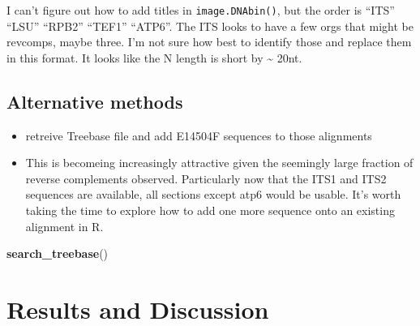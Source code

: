 \documentclass[11pt,]{article}
\newenvironment{Shaded}{\begin{snugshade}}{\end{snugshade}}
\newcommand{\KeywordTok}[1]{\textcolor[rgb]{0.13,0.29,0.53}{\textbf{{#1}}}}
\newcommand{\NormalTok}[1]{{#1}}
\providecommand{\tightlist}{%
  \setlength{\itemsep}{0pt}\setlength{\parskip}{0pt}}
\begin{document}
I can't figure out how to add titles in \texttt{image.DNAbin()}, but the
order is ``ITS'' ``LSU'' ``RPB2'' ``TEF1'' ``ATP6''. The ITS looks to
have a few orgs that might be revcomps, maybe three. I'm not sure how
best to identify those and replace them in this format. It looks like
the N length is short by \textasciitilde{} 20nt.

\subsection{Alternative methods}\label{alternative-methods}

\begin{itemize}
\tightlist
\item
  retreive Treebase file and add E14504F sequences to those alignments
\item
  This is becomeing increasingly attractive given the seemingly large
  fraction of reverse complements observed. Particularly now that the
  ITS1 and ITS2 sequences are available, all sections except atp6 would
  be usable. It's worth taking the time to explore how to add one more
  sequence onto an existing alignment in R.
\end{itemize}

\begin{Shaded}
\begin{Highlighting}[]
\KeywordTok{search_treebase}\NormalTok{()}
\end{Highlighting}
\end{Shaded}

\section{Results and Discussion}\label{results-and-discussion}

\renewcommand\refname{References}

\end{document}
